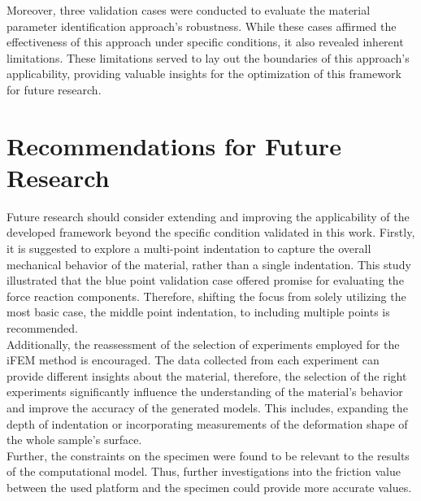 Moreover, three validation cases were conducted to evaluate the material parameter identification 
approach's robustness. While these cases affirmed the effectiveness of this approach under 
specific conditions, it also revealed inherent limitations. These limitations served to 
lay out the boundaries of this approach's applicability, providing valuable insights for the 
optimization of this framework for future research.


\section{Recommendations for Future Research}
Future research should consider extending and improving the applicability of the developed 
framework beyond the specific condition validated in this work. Firstly, it is suggested to explore 
a multi-point indentation to capture the overall mechanical behavior of the material, rather than a 
single indentation. This study illustrated that the blue point validation case offered promise 
for evaluating the force reaction components. Therefore, shifting the focus from solely utilizing 
the most basic case, the middle point indentation, to including multiple points is recommended.\\

Additionally, the reassessment of the selection of experiments employed for the iFEM method is 
encouraged. The data collected from each experiment can provide different insights about the material, therefore, 
the selection of the right experiments significantly influence the understanding of the material's behavior and 
improve the accuracy of the generated models. This includes, expanding the depth of indentation or incorporating 
measurements of the deformation shape of the whole sample's surface.\\

Further, the constraints on the specimen were found to be relevant to the results of the computational model.
Thus, further investigations into the friction value between the used platform and the specimen could 
provide more accurate values.\\


